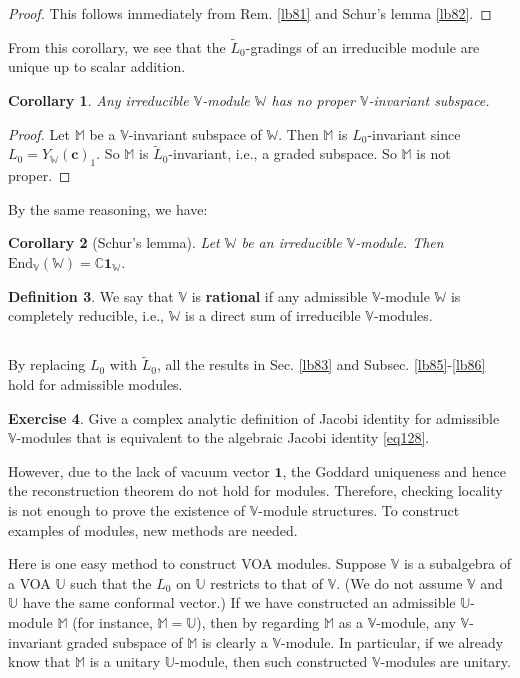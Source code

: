 \documentclass[12pt,a4paper,notitlepage]{article}
\theoremstyle{definition}
\newtheorem{df}{Definition}[section]
\newtheorem{exe}[df]{Exercise}
\theoremstyle{plain}
\newtheorem{co}[df]{Corollary}
\newcommand{\wtd}{\widetilde}
\newcommand{\End}{\mathrm{End}} %
\newcommand{\id}{\mathbf{1}}
\newcommand{\Vbb}{\mathbb V}
\newcommand{\Ubb}{\mathbb U}
\newcommand{\Wbb}{\mathbb W}
\newcommand{\Mbb}{\mathbb M}
\newcommand{\Cbb}{\mathbb C}
\newcommand{\cbf}{\mathbf c}
\numberwithin{equation}{section}
\begin{document}
\begin{proof}
This follows immediately from Rem. \ref{lb81} and Schur's lemma \ref{lb82}.
\end{proof}

From this corollary, we see that the $\wtd L_0$-gradings of an irreducible module are unique up to scalar addition.

\begin{co}
Any irreducible $\Vbb$-module $\Wbb$ has no proper $\Vbb$-invariant subspace.
\end{co}


\begin{proof}
Let $\Mbb$ be a $\Vbb$-invariant subspace of $\Wbb$. Then $\Mbb$ is $L_0$-invariant since $L_0=Y_\Wbb(\cbf)_1$. So $\Mbb$ is $\wtd L_0$-invariant, i.e., a graded subspace. So $\Mbb$ is not proper.
\end{proof}

By the same reasoning, we have:
\begin{co}[Schur's lemma]
Let $\Wbb$ be an irreducible $\Vbb$-module. Then $\End_\Vbb(\Wbb)=\Cbb\id_\Wbb$.
\end{co}


\begin{df}\label{lb164}
We say that $\Vbb$ is \textbf{rational}  if any admissible $\Vbb$-module $\Wbb$ is completely reducible, i.e., $\Wbb$ is a direct sum of irreducible $\Vbb$-modules.
\end{df}




\subsection{}

By replacing $L_0$ with $\wtd L_0$, all the results in Sec. \ref{lb83} and Subsec. \ref{lb85}-\ref{lb86} hold for admissible modules. 
\begin{exe}
Give a complex analytic definition of Jacobi identity for admissible $\Vbb$-modules that is equivalent to the algebraic Jacobi identity \eqref{eq128}.
\end{exe}
However, due to the lack of vacuum vector $\id$, the Goddard uniqueness and hence the reconstruction theorem do not hold for modules. Therefore, checking locality is not enough to prove the existence of $\Vbb$-module structures. To construct examples of modules, new methods are needed. 

Here is one easy method to construct VOA modules. Suppose $\Vbb$ is a subalgebra of a VOA $\Ubb$ such that the $L_0$ on $\Ubb$ restricts to that of $\Vbb$. (We do not assume $\Vbb$ and $\Ubb$ have the same conformal vector.) If we have constructed an admissible $\Ubb$-module $\Mbb$ (for instance, $\Mbb=\Ubb$), then by regarding $\Mbb$ as a $\Vbb$-module, any $\Vbb$-invariant graded subspace of $\Mbb$ is clearly a $\Vbb$-module.  In particular, if we already know that $\Mbb$ is a unitary $\Ubb$-module, then such constructed $\Vbb$-modules are unitary. 
\end{document}
